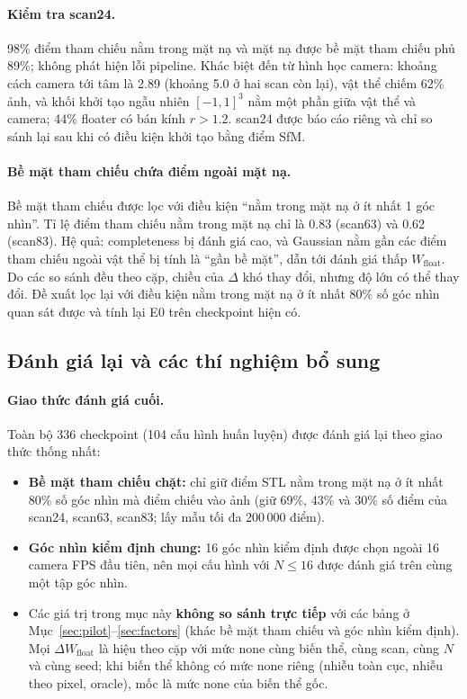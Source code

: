 \documentclass[11pt,a4paper]{article}
\begin{document}
\paragraph{Kiểm tra scan24.} 98\% điểm tham chiếu nằm trong mặt nạ và mặt nạ được bề mặt tham chiếu phủ 89\%; không phát hiện lỗi pipeline. Khác biệt đến từ hình học camera: khoảng cách camera tới tâm là 2.89 (khoảng 5.0 ở hai scan còn lại), vật thể chiếm 62\% ảnh, và khối khởi tạo ngẫu nhiên $[-1,1]^3$ nằm một phần giữa vật thể và camera; 44\% floater có bán kính $r>1.2$. scan24 được báo cáo riêng và chỉ so sánh lại sau khi có điều kiện khởi tạo bằng điểm SfM.

\paragraph{Bề mặt tham chiếu chứa điểm ngoài mặt nạ.} Bề mặt tham chiếu được lọc với điều kiện ``nằm trong mặt nạ ở ít nhất 1 góc nhìn''. Tỉ lệ điểm tham chiếu nằm trong mặt nạ chỉ là 0.83 (scan63) và 0.62 (scan83). Hệ quả: completeness bị đánh giá cao, và Gaussian nằm gần các điểm tham chiếu ngoài vật thể bị tính là ``gần bề mặt'', dẫn tới đánh giá thấp $W_{\text{float}}$. Do các so sánh đều theo cặp, chiều của $\Delta$ khó thay đổi, nhưng độ lớn có thể thay đổi. Đề xuất lọc lại với điều kiện nằm trong mặt nạ ở ít nhất 80\% số góc nhìn quan sát được và tính lại E0 trên checkpoint hiện có.

\subsection{Đánh giá lại và các thí nghiệm bổ sung}
\label{sec:final}
\paragraph{Giao thức đánh giá cuối.} Toàn bộ 336 checkpoint (104 cấu hình huấn luyện) được đánh giá lại theo giao thức thống nhất:
\begin{itemize}
  \item \textbf{Bề mặt tham chiếu chặt:} chỉ giữ điểm STL nằm trong mặt nạ ở ít nhất 80\% số góc nhìn mà điểm chiếu vào ảnh (giữ 69\%, 43\% và 30\% số điểm của scan24, scan63, scan83; lấy mẫu tối đa 200\,000 điểm).
  \item \textbf{Góc nhìn kiểm định chung:} 16 góc nhìn kiểm định được chọn ngoài 16 camera FPS đầu tiên, nên mọi cấu hình với $N\le 16$ được đánh giá trên cùng một tập góc nhìn.
  \item Các giá trị trong mục này \textbf{không so sánh trực tiếp} với các bảng ở Mục~\ref{sec:pilot}--\ref{sec:factors} (khác bề mặt tham chiếu và góc nhìn kiểm định). Mọi $\Delta W_{\text{float}}$ là hiệu theo cặp với mức none cùng biến thể, cùng scan, cùng $N$ và cùng seed; khi biến thể không có mức none riêng (nhiễu toàn cục, nhiễu theo pixel, oracle), mốc là mức none của biến thể gốc.
\end{itemize}
\end{document}
